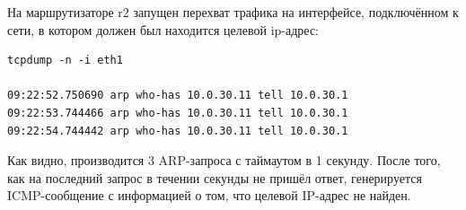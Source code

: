 \documentclass[a4paper,12pt]{article}
\begin{document}
На маршрутизаторе r2 запущен перехват трафика на интерфейсе, подключённом к сети, в котором должен был находится целевой ip-адрес:

\begin{Verbatim}
tcpdump -n -i eth1

09:22:52.750690 arp who-has 10.0.30.11 tell 10.0.30.1
09:22:53.744466 arp who-has 10.0.30.11 tell 10.0.30.1
09:22:54.744442 arp who-has 10.0.30.11 tell 10.0.30.1

\end{Verbatim}

Как видно, производится 3 ARP-запроса с таймаутом в 1 секунду. После того, как на последний запрос в течении секунды не пришёл ответ, 
генерируется ICMP-сообщение с информацией о том, что целевой IP-адрес не найден.
\end{document}
